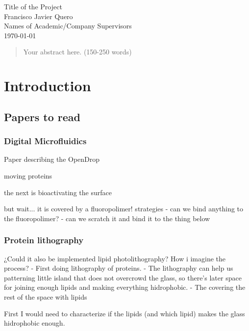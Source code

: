 \documentclass[12pt]{article}
\begin{document}
\begin{titlepage}
    \centering
    \vspace*{60px}
    \huge{Title of the Project}\\
    \vspace{10px}
    \large{Francisco Javier Quero}\\
    \large{Names of Academic/Company Supervisors}\\
    \vfill
    \today
    \vfill
\end{titlepage}

\newpage
\begin{abstract}
\noindent
Your abstract here. (150-250 words)
\end{abstract}

\newpage
\section*{Introduction}
\subsection*{Papers to read}
\subsubsection*{Digital Microfluidics}

Paper describing the OpenDrop

moving proteins

\cite{strale_multiprotein_2016}

the next is bioactivating the surface

but wait... it is covered by a fluoropolimer!
strategies
 - can we bind anything to the fluoropolimer?
  - can we scratch it and bind it to the thing below


\subsubsection*{Protein lithography}
¿Could it also be implemented lipid photolithography?
How i imagine the process?
 - First doing lithography of proteins. 
      - The lithography can help us patterning little island that does not overcrowd the glass, so there's later space for joining enough lipids and making everything hidrophobic.
 - The covering the rest of the space with lipids

 First I would need to characterize if the lipids (and which lipid) makes the glass hidrophobic enough.
\end{document}
